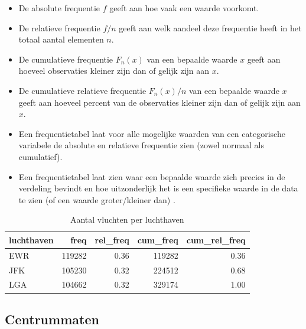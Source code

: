\documentclass[]{tufte-book}
\providecommand{\tightlist}{%
  \setlength{\itemsep}{0pt}\setlength{\parskip}{0pt}}
\begin{document}
\begin{itemize}
\tightlist
\item
  De absolute frequentie \(f\) geeft aan hoe vaak een waarde voorkomt.
\item
  De relatieve frequentie \(f/n\) geeft aan welk aandeel deze frequentie heeft in het totaal aantal elementen \(n\).
\item
  De cumulatieve frequentie \(F_n(x)\) van een bepaalde waarde \(x\) geeft aan hoeveel observaties kleiner zijn dan of gelijk zijn aan \(x\).
\item
  De cumulatieve relatieve frequentie \(F_n(x)/n\) van een bepaalde waarde \(x\) geeft aan hoeveel percent van de observaties kleiner zijn dan of gelijk zijn aan \(x\).
\item
  Een frequentietabel laat voor alle mogelijke waarden van een categorische variabele de absolute en relatieve frequentie zien (zowel normaal als cumulatief).
\item
  Een frequentietabel laat zien waar een bepaalde waarde zich precies in de verdeling bevindt en hoe uitzonderlijk het is een specifieke waarde in de data te zien (of een waarde groter/kleiner dan) .
\end{itemize}

\begin{table}

\caption{\label{tab:4-4}Aantal vluchten per luchthaven}
\centering
\fontsize{10}{12}\selectfont
\begin{tabular}[t]{lrrrr}
\toprule
luchthaven & freq & rel\_freq & cum\_freq & cum\_rel\_freq\\
\midrule
EWR & 119282 & 0.36 & 119282 & 0.36\\
JFK & 105230 & 0.32 & 224512 & 0.68\\
LGA & 104662 & 0.32 & 329174 & 1.00\\
\bottomrule
\end{tabular}
\end{table}

\hypertarget{centrummaten}{%
\subsection*{Centrummaten}\label{centrummaten}}
\end{document}
